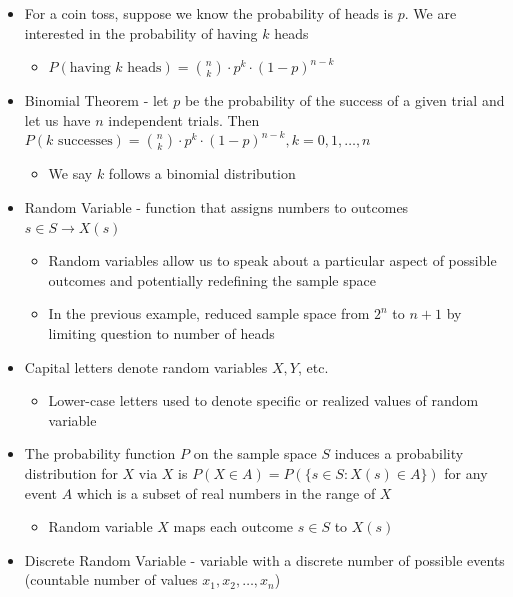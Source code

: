 \documentclass{article}
\begin{document}
\begin{itemize}
\subsection{Slide 3}
    \item For a coin toss, suppose we know the probability of heads is $p$. We are interested in the probability of having $k$ heads
    \begin{itemize}
        \item $P(\text{having } k \text{ heads}) = \binom{n}{k} \cdot p^k \cdot (1-p)^{n-k}$
    \end{itemize}
    \item Binomial Theorem - let $p$ be the probability of the success of a given trial and let us have $n$ independent trials. Then $P(k \text{ successes}) = \binom{n}{k} \cdot p^k \cdot (1-p)^{n-k}, k = 0,1,\dots,n$
    \begin{itemize}
        \item We say $k$ follows a binomial distribution
    \end{itemize}
    \item Random Variable - function that assigns numbers to outcomes $s \in S \rightarrow X(s)$
    \begin{itemize}
        \item Random variables allow us to speak about a particular aspect of possible outcomes and potentially redefining the sample space 
        \item In the previous example, reduced sample space from $2^n$ to $n+1$ by limiting question to number of heads
    \end{itemize}
    \item Capital letters denote random variables $X,Y$, etc.
    \begin{itemize}
        \item Lower-case letters used to denote specific or realized values of random variable
    \end{itemize}
    \item The probability function $P$ on the sample space $S$ induces a probability distribution for $X$ via $X$ is $P(X \in A) = P(\{s \in S : X(s) \in A \})$ for any event $A$ which is a subset of real numbers in the range of $X$
    \begin{itemize}
        \item Random variable $X$ maps each outcome $s \in S$ to $X(s)$
    \end{itemize} 
    \item Discrete Random Variable - variable with a discrete number of possible events (countable number of values $x_1,x_2,\dots,x_n$)

\end{itemize}
\end{document}
